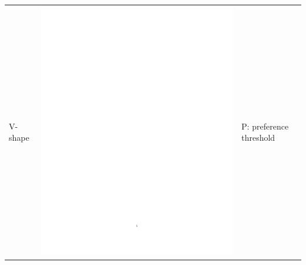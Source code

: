 \begin{enumerate}
\begin{table}[h!]
\begin{center}
\begin{tabular}{|l|c|b{4.2cm}|}
\hline V-shape & \includegraphics[page=2,trim=7.5cm 13.8cm 3.5cm 6.5cm,clip,scale=0.36]{prom_vshape_pdf} & P: preference threshold\\

\end{tabular}
\end{center}
\end{table}
\end{enumerate}
